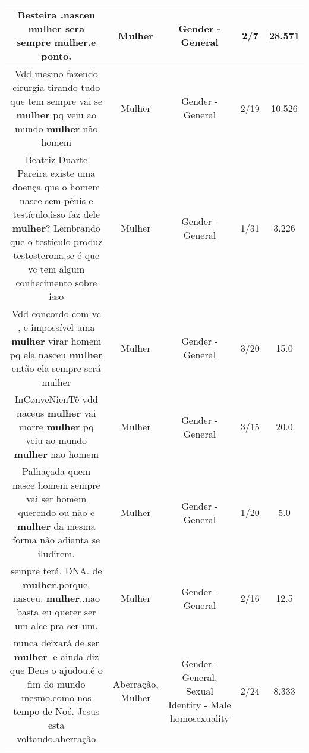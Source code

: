 \documentclass[11pt]{article}
\newlength\mylength
\begin{document}
\begin{center}
\begin{longtable}{|C{.65\mylength}|C{.30\mylength}|C{.12\mylength}|C{.12\mylength}|C{.12\mylength}|}
  \small Besteira .nasceu \textbf{mulher} sera sempre \textbf{mulher}.e ponto.\normalsize   & Mulher & Gender - General & 2/7 & 28.571 \\  \hline
  \small Vdd mesmo fazendo cirurgia tirando tudo que tem sempre vai se \textbf{mulher} pq veiu ao mundo \textbf{mulher} não homem\normalsize   & Mulher & Gender - General & 2/19 & 10.526 \\  \hline
  \small Beatriz Duarte Pareira existe uma doença que o homem nasce sem pênis e testículo,isso faz dele \textbf{mulher}? Lembrando que o testículo produz testosterona,se é que vc tem algum conhecimento sobre isso\normalsize   & Mulher & Gender - General & 1/31 & 3.226 \\  \hline
  \small Vdd concordo com vc , e impossível uma \textbf{mulher} virar homem pq ela nasceu \textbf{mulher} então ela sempre será mulher\normalsize   & Mulher & Gender - General & 3/20 & 15.0 \\  \hline
  \small {} InCønveNienTë vdd naceus \textbf{mulher} vai morre \textbf{mulher} pq veiu ao mundo \textbf{mulher} nao homem\normalsize   & Mulher & Gender - General & 3/15 & 20.0 \\  \hline
  \small Palhaçada  quem nasce homem sempre vai ser homem querendo ou não e \textbf{mulher} da mesma forma não adianta se iludirem.\normalsize   & Mulher & Gender - General & 1/20 & 5.0 \\  \hline
  \small sempre terá. DNA. de \textbf{mulher}.porque. nasceu. \textbf{mulher}..nao basta eu querer ser um alce pra ser um.\normalsize   & Mulher & Gender - General & 2/16 & 12.5 \\  \hline
  \small nunca deixará de ser \textbf{mulher} .e ainda diz que Deus o ajudou.é o fim do mundo mesmo.como nos tempo de Noé. Jesus esta voltando.aberração\normalsize   & Aberração, Mulher & Gender - General, Sexual Identity - Male homosexuality & 2/24 & 8.333 \\  \hline

\end{longtable}
\end{center}
\end{document}
